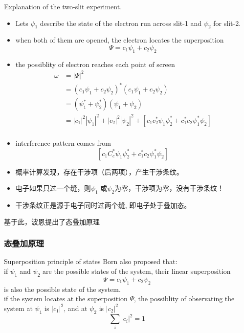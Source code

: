 \begin{frame} [allowframebreaks=]
    Explanation of the two-slit experiment.\\
    \begin{itemize}
        \item Lets $\psi_1$ describe the state of the electron run across slit-1 and $\psi_2$ for slit-2. \\
        \item when both of them are opened, the electron locates the superposition 
            \[ \Psi=c_1 \psi_1+ c_2\psi_2 \]
        \item the possiblity of electron reaches each point of screen 
    \begin{equation*}
        \begin{split}
            \omega &=|\Psi|^2 \\
            &= (c_1 \psi_1+ c_2\psi_2)^* (c_1 \psi_1+ c_2\psi_2) \\
            &=(\psi_1^*+\psi_2^*)(\psi_1+\psi_2) \\ 
            & = |c_1|^2 |\psi_1|^2 + |c_2|^2 |\psi_2|^2  + [c_1 c_2 ^* \psi_1 \psi_2 ^* + c_1 ^* c_2 \psi_1 ^* \psi_2] \\
        \end{split} 
    \end{equation*}
        \item interference pattern comes from  
     \[[c_1 C_c ^* \psi_1 \psi_2 ^* + c_1 ^* c_2 \psi_1 ^* \psi_2] \]
    \end{itemize}
    \begin{itemize}
        \item 概率计算发现，存在干涉项（后两项），产生干涉条纹。
        \item 电子如果只过一个缝，则$\psi_1$ 或$\psi_2$为零，干涉项为零，没有干涉条纹！
        \item 干涉条纹正是源于电子同时过两个缝, 即电子处于叠加态。
    \end{itemize}
    基于此，波恩提出了态叠加原理
\end{frame}

\begin{frame}
    \frametitle{态叠加原理}
    \begin{tcolorbox1}{Superposition principle of states}
    Born also proposed that: \\
    if $\psi_1$ and $\psi_2$ are the possible states of the system,
    their linear superposition \[ \Psi=c_1 \psi_1+ c_2\psi_2 \]
    is also the possible state of the system.\\
    if the system locates at the superposition $\Psi$, the possiblity of observating the system at $\psi_1$ is $|c_1|^2$, and at $\psi_2$ is $|c_2|^2$ \\
    \[\sum_i |c_i|^2 =1\]
    \end{tcolorbox1}
\end{frame}

